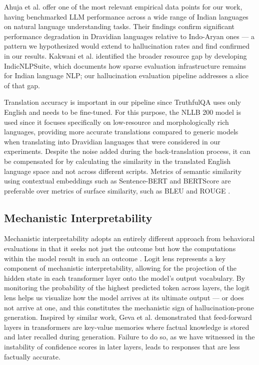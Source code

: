 \documentclass[conference]{IEEEtran}
\begin{document}
Ahuja et al. \cite{b24} offer one of the most relevant empirical data points for our work, having benchmarked LLM
performance across a wide range of Indian languages on
natural language understanding tasks. Their findings confirm
significant performance degradation in Dravidian languages
relative to Indo-Aryan ones — a pattern we hypothesized
would extend to hallucination rates and find confirmed in our
results. Kakwani et al. \cite{b25} identified the broader resource gap
by developing IndicNLPSuite, which documents how sparse
evaluation infrastructure remains for Indian language NLP; our
hallucination evaluation pipeline addresses a slice of that gap.

Translation accuracy is important in our pipeline since TruthfulQA uses only English and needs to be fine-tuned.
For this purpose, the NLLB 200 \cite{b9} model is used since it focuses specifically on low-resource and morphologically rich languages, providing more accurate translations compared to generic models when translating into Dravidian languages that were considered in our experiments. Despite the noise added during the back-translation process, it can be compensated for by calculating the similarity in the translated English language space and not across different scripts. Metrics of semantic similarity using contextual embeddings such as Sentence-BERT \cite{b4}
and BERTScore \cite{b5} are preferable over metrics of surface similarity, such as BLEU \cite{b14} and ROUGE \cite{b26}.

\subsection{Mechanistic Interpretability}

Mechanistic interpretability adopts an entirely different approach
from behavioral evaluations in that it seeks not just the outcome
but how the computations within the model result in such an outcome \cite{b27}. Logit lens \cite{b15} represents a key component
of mechanistic interpretability, allowing for the projection of the
hidden state in each transformer layer onto the model’s output
vocabulary. By monitoring the probability of the highest predicted token across layers, the logit lens helps us visualize how the
model arrives at its ultimate output — or does not arrive at one,
and this constitutes the mechanistic sign of hallucination-prone
generation. Inspired by similar work, Geva et al. \cite{b28} demonstrated that feed-forward layers in transformers are key-value
memories where factual knowledge is stored and later recalled during generation. Failure to do so, as we have witnessed in the
instability of confidence scores in later layers, leads to responses
that are less factually accurate.
\end{document}
